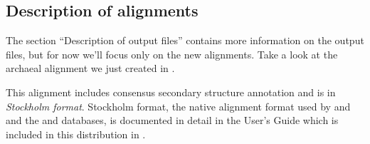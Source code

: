 \subsection{Description of alignments}

The section ``Description of output files'' contains more information
on the output files, but for now we'll focus only on the new
alignments.  Take a look at the archaeal alignment we just created in
.

This alignment includes consensus secondary structure annotation and
is in \emph{Stockholm format}. 
Stockholm format, the native alignment format used by  and
 and the  and 
databases, is documented in detail in the  User's
Guide which is included in this distribution in
.

